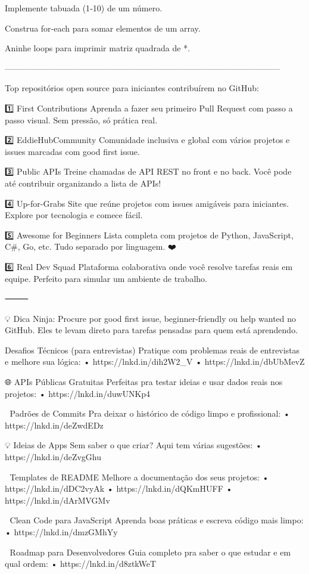 Implemente tabuada (1‑10) de um número.

Construa for‑each para somar elementos de um array.

Aninhe loops para imprimir matriz quadrada de *.

---------------------------------------------------------------------------------------------------

Top repositórios open source para iniciantes contribuírem no GitHub:

1️⃣ First Contributions
Aprenda a fazer seu primeiro Pull Request com passo a passo visual. Sem pressão, só prática real.

2️⃣ EddieHubCommunity
Comunidade inclusiva e global com vários projetos e issues marcadas com good first issue.

3️⃣ Public APIs
Treine chamadas de API REST no front e no back. Você pode até contribuir organizando a lista de APIs!

4️⃣ Up-for-Grabs
Site que reúne projetos com issues amigáveis para iniciantes. Explore por tecnologia e comece fácil.

5️⃣ Awesome for Beginners
Lista completa com projetos de Python, JavaScript, C#, Go, etc. Tudo separado por linguagem. ❤️

6️⃣ Real Dev Squad
Plataforma colaborativa onde você resolve tarefas reais em equipe. Perfeito para simular um ambiente de trabalho.

⸻

💡 Dica Ninja:
Procure por good first issue, beginner-friendly ou help wanted no GitHub.
Eles te levam direto para tarefas pensadas para quem está aprendendo.

 Desafios Técnicos (para entrevistas)
Pratique com problemas reais de entrevistas e melhore sua lógica:
 • https://lnkd.in/dih2W2_V
 • https://lnkd.in/dbUbMevZ

🌐 APIs Públicas Gratuitas
Perfeitas pra testar ideias e usar dados reais nos projetos:
 • https://lnkd.in/duwUNKp4

📜 Padrões de Commits
Pra deixar o histórico de código limpo e profissional:
 • https://lnkd.in/deZwdEDz

💡 Ideias de Apps
Sem saber o que criar? Aqui tem várias sugestões:
 • https://lnkd.in/deZvgGhu

📝 Templates de README
Melhore a documentação dos seus projetos:
 • https://lnkd.in/dDC2vyAk
 • https://lnkd.in/dQKmHUFF
 • https://lnkd.in/dArMVGMv

🎯 Clean Code para JavaScript
Aprenda boas práticas e escreva código mais limpo:
 • https://lnkd.in/dmzGMhYy

🚀 Roadmap para Desenvolvedores
Guia completo pra saber o que estudar e em qual ordem:
 • https://lnkd.in/d8ztkWeT
